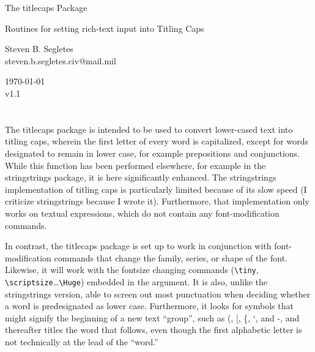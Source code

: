 \documentclass{article}
\def\version{1.1}
\def\tcp{\textsf{titlecaps}}
\let\vb\verb
\begin{document}
\begin{center}
\LARGE The {\tcp} Package\\
\rule{0em}{.7em}\small Routines for setting rich-text input into
Titling Caps\\
\rule{0em}{2.7em}\large Steven B. Segletes\\
steven.b.segletes.civ@mail.mil\\
\rule{0em}{1.7em}\today\\
v\version
\end{center}

\section{}

The {\tcp} package is intended to be used to convert lower-cased text
into titling caps, wherein the first letter of every word is
capitalized, except for words designated to remain in lower case, for
example prepositions and conjunctions.  While this function has been
performed elsewhere, for example in the \textsf{stringstrings} package,
it is here significantly enhanced.  The \textsf{stringstrings}
implementation of titling caps is particularly limited because of its
slow speed (I criticize \textsf{stringstrings} because I wrote it).
Furthermore, that implementation only works on textual expressions,
which do not contain any font-modification commands.  

In contrast, the {\tcp} package is set up to work in conjunction with
font-modification commands that change the family, series, or shape of
the font.  Likewise, it will work with the fontsize changing commands
(\vb|\tiny|, \vb|\scriptsize|\ldots\SoftSpace\vb|\Huge|) embedded in the
argument.  It is also, unlike the \textsf{stringstrings} version, able
to screen out most punctuation when deciding whether a word is
predesignated as lower case.  Furthermore, it looks for symbols that
might signify the beginning of a new text ``group'', such as (, [, \{,
`, and -, and thereafter titles the word that follows, even though the
first alphabetic letter is not technically at the lead of the ``word.''
\end{document}
